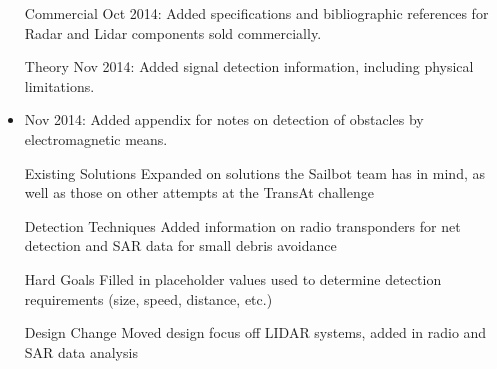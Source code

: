 \begin{itemize}
\item[Commercial] Oct 2014: Added specifications and bibliographic references for Radar and Lidar components sold commercially.
\item[Theory] Nov 2014: Added signal detection information, including physical limitations.
\item Nov 2014: Added appendix for notes on detection of obstacles by electromagnetic means.
\item[Existing Solutions] Expanded on solutions the Sailbot team has in mind, as well as those on other attempts at the TransAt challenge
\item[Detection Techniques] Added information on radio transponders for net detection and SAR data for small debris avoidance
\item[Hard Goals] Filled in placeholder values used to determine detection requirements (size, speed, distance, etc.)
\item[Design Change] Moved design focus off LIDAR systems, added in radio and SAR data analysis
\end{itemize}